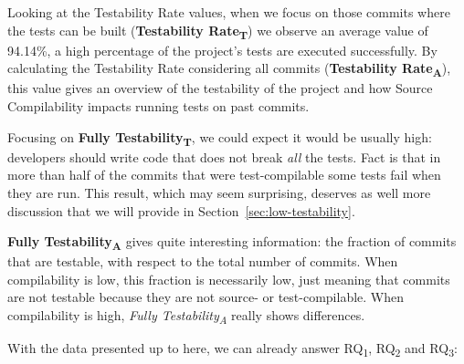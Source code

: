 Looking at the Testability Rate values, when we focus on those commits where the tests can be built (\textbf{Testability Rate\textsubscript{T}}) we observe an average value of 94.14\%, a high percentage of the project's tests are executed successfully. 
By calculating the Testability Rate considering all commits (\textbf{Testability Rate\textsubscript{A}}), this value gives an overview of the testability of the project and how Source Compilability impacts running tests on past commits.

Focusing on \textbf{Fully Testability\textsubscript{T}}, we could expect it would be usually high: developers should write code that does not break \textit{all} the tests. 
Fact is that in more than half of the commits that were test-compilable some tests fail when they are run. 
This result, which may seem surprising, deserves as well more discussion that we will provide in Section~\ref{sec:low-testability}.

\textbf{Fully Testability\textsubscript{A}} gives quite interesting information: the fraction of commits that are testable, with respect to the total number of commits. 
When compilability is low, this fraction is necessarily low, just meaning that commits are not testable because they are not source- or test-compilable. 
When compilability is high, \textit{Fully Testability\textsubscript{A}} really shows differences. 

With the data presented up to here, we can already answer RQ\textsubscript{1}, RQ\textsubscript{2} and RQ\textsubscript{3}:

\vspace{0.5cm}

